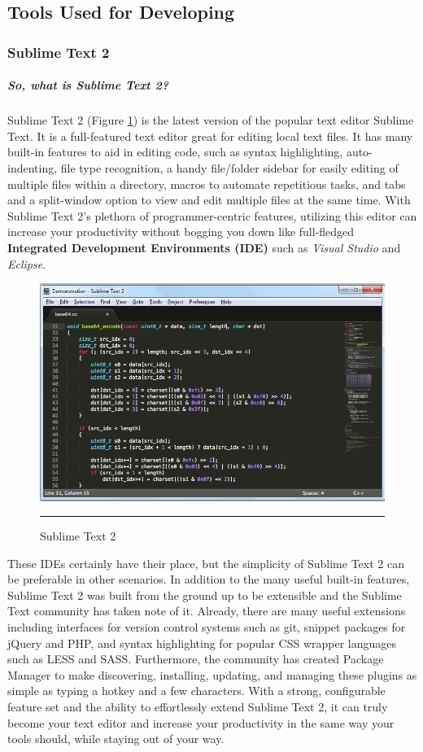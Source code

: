\subsection{Tools Used for Developing}
\subsubsection{Sublime Text 2}
\subparagraph*{So, what is Sublime Text 2?}
\hfill \break
Sublime Text 2 (Figure \ref{fig:sublime}) is the latest version of the popular text editor Sublime Text. It is a full-featured text
editor great for editing local text files. It has many built-in features to aid in editing code, such as
syntax highlighting, auto-indenting, file type recognition, a handy file/folder sidebar for easily
editing of multiple files within a directory, macros to automate repetitious tasks, and tabs and a
split-window option to view and edit multiple files at the same time. With Sublime Text 2's plethora
of programmer-centric features, utilizing this editor can increase your productivity without
bogging you down like full-fledged \textbf{Integrated Development Environments (IDE)} such as \textit{Visual
Studio} and \textit{Eclipse}. 
\begin{figure}[h!]
  \centering
    \includegraphics[width=1\textwidth]{./Pictures/sublime.jpg}
  \rule{1\textwidth}{1pt}
  \caption{Sublime Text 2}
    \label{fig:sublime}
\end{figure}

These IDEs certainly have their place, but the simplicity of Sublime Text 2
can be preferable in other scenarios. In addition to the many useful built-in features, Sublime Text
2 was built from the ground up to be extensible and the Sublime Text community has taken note
of it. Already, there are many useful extensions including interfaces for version control systems
such as git, snippet packages for jQuery and PHP, and syntax highlighting for popular CSS wrapper
languages such as LESS and SASS. Furthermore, the community has created Package Manager to
make discovering, installing, updating, and managing these plugins as simple as typing a hotkey
and a few characters. With a strong, configurable feature set and the ability to effortlessly extend
Sublime Text 2, it can truly become your text editor and increase your productivity in the same way
your tools should, while staying out of your way.




